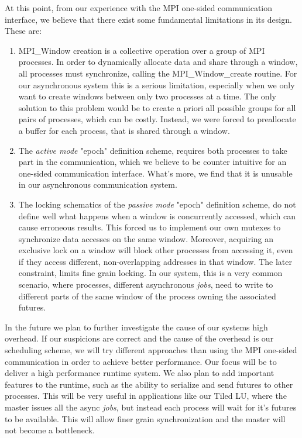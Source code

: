 At this point, from our experience with the MPI one-sided communication interface, we believe that there exist
some fundamental limitations in its design. These are:
\\
\begin{enumerate}
	\item MPI\_Window creation is a collective operation over a group of MPI processes.  In order to dynamically
				allocate data and share through a window, all processes must synchronize, calling the MPI\_Window\_create
				routine.  For our asynchronous system this is a serious limitation, especially when we only want to create
				windows between only two processes at a time.  The only solution to this problem would be to create a priori
				all possible groups for all pairs of processes, which can be costly.  Instead, we were forced to preallocate
				a buffer for each process, that is shared through a window.
	
	\item The \emph{active mode} "epoch" definition scheme, requires both processes to take part in the communication,
				which we believe to be counter intuitive for an one-sided communication interface. What's more, we find that
				it is unusable in our asynchronous communication system.

	\item The locking schematics of the \emph{passive mode} "epoch" definition scheme, do not define well what happens
				when a window is concurrently accessed, which can cause erroneous results.  This forced us to implement our
				own mutexes to synchronize data accesses on the same window.  Moreover, acquiring an exclusive lock on a 
				window will block other processes from accessing it, even if they access different, non-overlapping addresses
				in that window.  The later constraint, limits fine grain locking.  In our system, this is a very common
				scenario, where processes, different asynchronous \emph{jobs}, need to write to different parts of the same
		 		window of the process owning the associated futures.   
\\
\end{enumerate}

In the future we plan to further investigate the cause of our systems high overhead.  If our suspicions are correct
and the cause of the overhead is our scheduling scheme, we will try different approaches than using the MPI one-sided
communication in order to achieve better performance.  Our focus will be to deliver a high performance runtime system.
We also plan to add important features to the runtime, such as the ability to serialize and send futures to other 
processes.  This will be very useful in applications like our Tiled LU, where the master issues all the async \emph{jobs},
but instead each process will wait for it's futures to be available. This will allow finer grain synchronization and
the master will not become a bottleneck.

